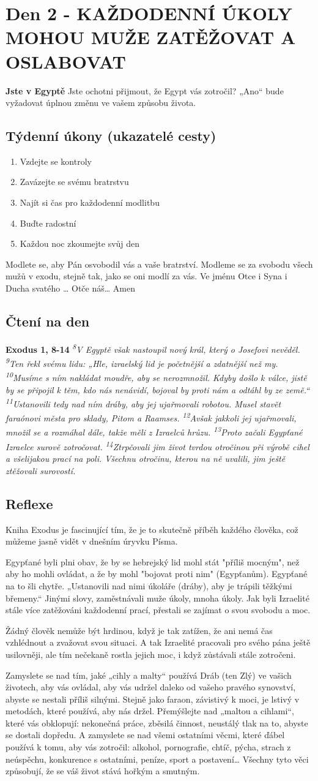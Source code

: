 \documentclass[11pt]{article}
\newcommand{\zacatekPrvniTyden}{
  \textbf{Jste v Egyptě} \newline
  Jste ochotni přijmout, že Egypt vás zotročil? „Ano“ bude vyžadovat úplnou změnu ve vašem způsobu života.

\subsection*{Týdenní úkony (ukazatelé cesty)}
\begin{enumerate}
  \item Vzdejte se kontroly
  \item Zavázejte se svému bratrstvu
  \item Najít si čas pro každodenní modlitbu
  \item Buďte radostní
  \item Každou noc zkoumejte svůj den
\end{enumerate}
Modlete se, aby Pán osvobodil vás a vaše bratrství. \newline
Modleme se za svobodu všech mužů v exodu, stejně tak, jako se oni modlí za vás.\newline
Ve jménu Otce i Syna i Ducha svatého …  Otče náš… Amen
}
\begin{document}
\newpage
\section{Den 2 - KAŽDODENNÍ ÚKOLY MOHOU MUŽE ZATĚŽOVAT A OSLABOVAT}
\zacatekPrvniTyden
\subsection*{Čtení na den}
\textbf{Exodus 1, 8-14}
\newline
\textit{
\textsuperscript{8}V Egyptě však nastoupil nový král, který o Josefovi nevěděl.
\textsuperscript{9}Ten řekl svému lidu: „Hle, izraelský lid je početnější a zdatnější než my.
\textsuperscript{10}Musíme s ním nakládat moudře, aby se nerozmnožil. Kdyby došlo k válce, jistě by se připojil k těm, kdo nás nenávidí, bojoval by proti nám a odtáhl by ze země.“
\textsuperscript{11}Ustanovili tedy nad ním dráby, aby jej ujařmovali robotou. Musel stavět faraónovi města pro sklady, Pitom a Raamses.
\textsuperscript{12}Avšak jakkoli jej ujařmovali, množil se a rozmáhal dále, takže měli z Izraelců hrůzu.
\textsuperscript{13}Proto začali Egypťané Izraelce surově zotročovat.
\textsuperscript{14}Ztrpčovali jim život tvrdou otročinou při výrobě cihel a všelijakou prací na poli. Všechnu otročinu, kterou na ně uvalili, jim ještě ztěžovali surovostí.  
}\subsection*{Reflexe}
Kniha Exodus je fascinující tím, že je to skutečně příběh každého člověka, což můžeme jasně vidět v dnešním úryvku Písma.

Egypťané byli plni obav, že by se hebrejský lid mohl stát "příliš mocným", než aby ho mohli ovládat, a že by mohl "bojovat proti nim" (Egypťanům). Egypťané na to šli chytře. „Ustanovili nad nimi úkoláře (dráby), aby je trápili těžkými břemeny.“ Jinými slovy, zaměstnávali muže úkoly, mnoha úkoly.
Jak byli Izraelité stále více zatěžováni každodenní prací, přestali se zajímat o svou svobodu a moc.

Žádný člověk nemůže být hrdinou, když je tak zatížen, že ani nemá čas vzhlédnout a zvažovat svou situaci. A tak Izraelité pracovali pro svého pána ještě usilovněji, ale tím nečekaně rostla jejich moc, i když zůstávali stále zotročeni.

Zamyslete se nad tím, jaké „cihly a malty“ používá Dráb (ten Zlý) ve vašich životech, aby vás ovládal, aby vás udržel daleko od vašeho pravého synovství, abyste se nestali příliš silnými. Stejně jako faraon, závistivý k moci, je lstivý v metodách, které používá, aby nás držel.
Přemýšlejte nad „maltou a cihlami“, které vás obklopují: nekonečná práce, zběsilá činnost, neustálý tlak na to, abyste se dostali dopředu. A zamyslete se nad všemi ostatními věcmi, které ďábel používá k tomu, aby vás zotročil: alkohol, pornografie, chtíč, pýcha, strach z neúspěchu, konkurence s ostatními, peníze, sport a postavení… Všechny tyto věci způsobují, že se váš život stává hořkým a smutným.
\end{document}
